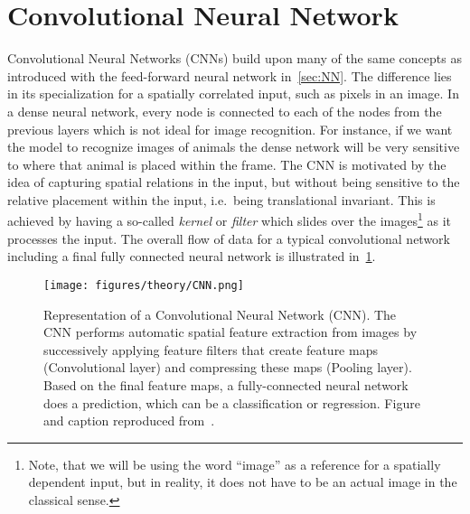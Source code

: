 \section{Convolutional Neural Network}\label{sec:CNN}
Convolutional Neural Networks (\acrshort{CNN}s) build upon many of the same
concepts as introduced with the feed-forward neural network in~\cref{sec:NN}.
The difference lies in its specialization for a spatially correlated input, such
as pixels in an image. In a dense neural network, every node is connected to
each of the nodes from the previous layers which is not ideal for image
recognition. For instance, if we want the model to recognize images of animals
the dense network will be very sensitive to where that animal is placed within
the frame. The \acrshort{CNN} is motivated by the idea of capturing spatial
relations in the input, but without being sensitive to the relative placement
within the input, i.e.\ being translational invariant. This is achieved by
having a so-called \textit{kernel} or \textit{filter} which slides over the
images\footnote{Note, that we will be using the word ``image'' as a reference
for a spatially dependent input, but in reality, it does not have to be an
actual image in the classical sense.} as it processes the input. The overall flow of data for a typical convolutional network including a final fully connected neural network is illustrated in~\cref{fig:CNN}. 

\begin{figure}[!htb]
  \centering
  \texttt{[image: figures/theory/CNN.png]}
  \caption{Representation of a Convolutional Neural Network (\acrshort{CNN}). The \acrshort{CNN} performs automatic spatial feature extraction from images by successively applying feature filters that create feature maps (Convolutional layer) and compressing these maps (Pooling layer). Based on the final feature maps, a fully-connected neural network does a prediction, which can be a classification or regression. Figure and caption reproduced from~\cite{cunha2022review}.}  
  \label{fig:CNN}
\end{figure}

